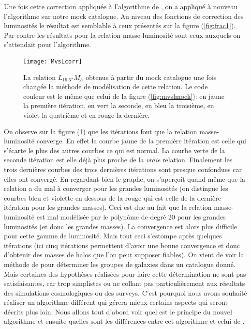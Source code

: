 Une fois cette correction appliquée à l'algorithme de \citet{Yang+07}, on a appliqué à nouveau l'algorithme sur notre mock
catalogue. Au niveau des fonctions de correction des luminosités le résultat est semblable à ceux présentés sur la figure
(\ref{fig:frac1}). Par contre les résultats pour la relation masse-luminosité sont ceux auxquels on s'attendait pour l'algorithme.
\begin{figure}[H]
	\centering
	\texttt{[image: MvsLcorr]}
	\caption{\footnotesize{}La relation $L_{19.5}$-$M_h$ obtenue à partir du mock catalogue une fois changée la méthode de
	modélisation de cette relation. Le code couleur est le même que celui de la figure (\ref{fig:mvslmock}): en jaune la
	première itération, en vert la seconde, en bleu la troisième, en violet la quatrième et en rouge la dernière.}
	\label{fig:mvslcorr}
\end{figure}
On observe sur la figure (\ref{fig:mvslcorr}) que les itérations font que la relation masse-luminosité converge. En effet la courbe
jaune de la première itération est celle qui s'écarte le plus des autres courbes ce qui est normal. La courbe verte de la seconde
itération est elle déjà plus proche de la \emph{vraie} relation. Finalement les trois dernières courbes des trois dernières
itérations sont presque confondues car elles ont convergé. En regardant bien le graphe, on s'aperçoit quand même que la relation a
du mal à converger pour les grandes luminosités (on distingue les courbes bleu et violette en dessous de la rouge qui est celle de
la dernière itération pour les grandes masses). Ceci est due au fait que la relation masse-luminosité est mal modélisée par le
polynôme de degré \num{20} pour les grandes luminosités (et donc les grandes masses). La convergence est alors plus difficile pour
cette gamme de luminosité. Mais tout ceci s'estompe après quelques itérations (ici cinq itérations permettent d'avoir une bonne
convergence et donc d'obtenir des masses de halos que l'on peut supposer fiables).
On vient de voir la méthode de \citet{Yang+07} pour déterminer les groupes de galaxies dans un catalogue donné. Mais certaines des
hypothèses réalisées pour faire cette détermination ne sont pas satisfaisantes, car trop simplistes ou ne collant pas
particulièrement aux résultats des simulations cosmologiques ou des surveys. C'est pourquoi nous avons souhaité réaliser un
algorithme différent qui gérera mieux certains aspects qui seront décrits plus loin.
Nous allons tout d'abord voir quel est le principe du nouvel algorithme et ensuite quelles sont les différences entre cet
algorithme et celui de \citet{Yang+07}.

